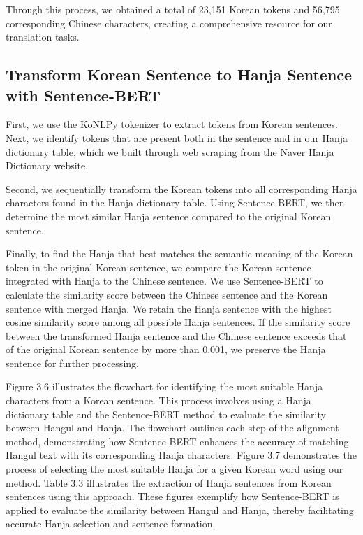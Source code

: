 \documentclass[PhD]{PHlab-thesis}
\begin{document}
Through this process, we obtained a total of 23,151 Korean tokens and 56,795 corresponding Chinese characters, creating a comprehensive resource for our translation tasks.


\subsection{Transform Korean Sentence to Hanja Sentence with Sentence-BERT}
First, we use the KoNLPy tokenizer to extract tokens from Korean sentences. Next, we identify tokens that are present both in the sentence and in our Hanja dictionary table, which we built through web scraping from the Naver Hanja Dictionary website.

Second, we sequentially transform the Korean tokens into all corresponding Hanja characters found in the Hanja dictionary table. Using Sentence-BERT, we then determine the most similar Hanja sentence compared to the original Korean sentence.

Finally, to find the Hanja that best matches the semantic meaning of the Korean token in the original Korean sentence, we compare the Korean sentence integrated with Hanja to the Chinese sentence. We use Sentence-BERT to calculate the similarity score between the Chinese sentence and the Korean sentence with merged Hanja. We retain the Hanja sentence with the highest cosine similarity score among all possible Hanja sentences. If the similarity score between the transformed Hanja sentence and the Chinese sentence exceeds that of the original Korean sentence by more than 0.001, we preserve the Hanja sentence for further processing.

Figure 3.6 illustrates the flowchart for identifying the most suitable Hanja characters from a Korean sentence. This process involves using a Hanja dictionary table and the Sentence-BERT method to evaluate the similarity between Hangul and Hanja. The flowchart outlines each step of the alignment method, demonstrating how Sentence-BERT enhances the accuracy of matching Hangul text with its corresponding Hanja characters. 
Figure 3.7 demonstrates the process of selecting the most suitable Hanja for a given Korean word using our method. 
Table 3.3 illustrates the extraction of Hanja sentences from Korean sentences using this approach. These figures exemplify how Sentence-BERT is applied to evaluate the similarity between Hangul and Hanja, thereby facilitating accurate Hanja selection and sentence formation.
\end{document}
